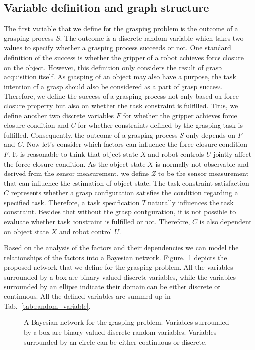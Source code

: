 \subsection{Variable definition and graph structure}
The first variable that we define for the grasping problem is the outcome of a grasping process $S$. The outcome is a discrete random variable which takes two values to specify whether a grasping process succeeds or not. One standard definition of the success is whether the gripper of a robot achieves force closure on the object. However, this definition only considers the result of grasp acquisition itself. As grasping of an object may also have a purpose, the task intention of a grasp should also be considered as a part of grasp success. Therefore, we define the success of a grasping process not only based on force closure property but also on whether the task constraint is fulfilled. Thus, we define another two discrete variables $F$ for whether the gripper achieves force closure condition and $C$ for whether constraints defined by the grasping task is fulfilled. Consequently, the outcome of a grasping process $S$ only depends on $F$ and $C$. Now let's consider which factors can influence the force closure condition $F$. It is reasonable to think that object state $X$ and robot controls $U$ jointly affect the force closure condition. As the object state $X$ is normally not observable and derived from the sensor measurement, we define $Z$ to be the sensor measurement that can influence the estimation of object state. The task constraint satisfaction $C$ represents whether a grasp configuration satisfies the condition regarding a specified task. Therefore, a task specification $T$ naturally influences the task constraint. Besides that without the grasp configuration, it is not possible to evaluate whether task constraint is fulfilled or not. Therefore, $C$ is also dependent on object state $X$ and robot control $U$.  

Based on the analysis of the factors and their dependencies we can model the  relationships of the factors into a Bayesian network. Figure.~\ref{fig:bnet} depicts the proposed network that we define for the grasping problem. All the variables surrounded by a box are binary-valued discrete variables, while the variables surrounded by an ellipse indicate their domain can be either discrete or continuous. All the defined variables are summed up in Tab.~\ref{tab:random_variable}.

\begin{figure}[!htbp]
\centering
%
\resizebox{.5\textwidth}{!}{}
\captionsetup{justification=raggedright}
\caption{A Bayesian network for the grasping problem. Variables surrounded by a box are binary-valued discrete random variables. Variables surrounded by an circle can be either continuous or discrete.}
\label{fig:bnet}
\end{figure}	


